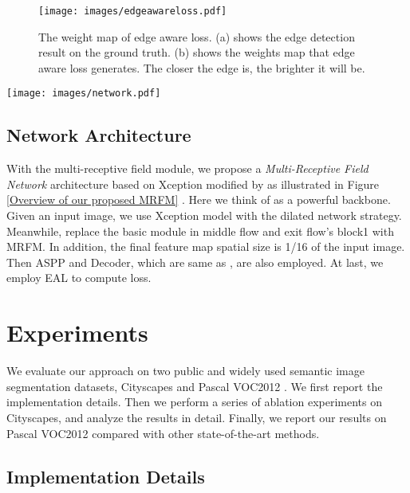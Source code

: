 \documentclass[final]{cvpr}
\begin{document}
\begin{figure}
\begin{center}
\texttt{[image: images/edgeawareloss.pdf]}
\end{center}
\caption{The weight map of edge aware loss. (a) shows the edge detection result on the ground truth. (b) shows the weights map that edge aware loss generates. The closer the edge is, the brighter it will be.}
\label{edgewareloss}
\end{figure}


\begin{figure*}[ht]
\begin{center}
\texttt{[image: images/network.pdf]}
\end{center}
\caption{Overview of Multi Receptive Field Network Architecture.}
\label{Overview of our proposed MRFM}
\end{figure*}


\subsection{Network Architecture}

With the multi-receptive field module, we propose a \emph{Multi-Receptive Field Network} architecture based on Xception modified by \cite{Deeplabv3+} as illustrated in Figure \ref{Overview of our proposed MRFM} . Here we think of \cite{Deeplabv3+} as a powerful backbone. Given an input image, we use Xception model with the dilated network strategy. Meanwhile, replace the basic module in middle flow and exit flow's block1 with MRFM. In addition, the final feature map spatial size is 1/16 of the input image. Then ASPP and Decoder, which are same as \cite{Deeplabv3+}, are also employed. At last, we employ EAL to compute loss.



\section{Experiments}

We evaluate our approach on two public and widely used semantic image segmentation datasets, Cityscapes \cite{cityscpaes} and Pascal VOC2012 \cite{everingham2012pascal}. We first report the implementation details. Then we perform a series of ablation experiments on Cityscapes, and analyze the results in detail. Finally, we report our results on Pascal VOC2012 compared with other state-of-the-art methods.

\subsection{Implementation Details}
\end{document}
